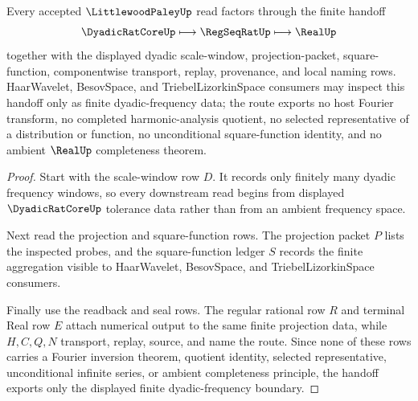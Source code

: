 \begin{theorem}
\label{thm:littlewood-paley-dyadic-frequency-handoff}
Every accepted $\LittlewoodPaleyUp$ read factors through the finite handoff
$$
\DyadicRatCoreUp \longmapsto \RegSeqRatUp \longmapsto \RealUp
$$
together with the displayed dyadic scale-window, projection-packet, square-function, componentwise transport, replay, provenance, and local naming rows. HaarWavelet, BesovSpace, and TriebelLizorkinSpace consumers may inspect this handoff only as finite dyadic-frequency data; the route exports no host Fourier transform, no completed harmonic-analysis quotient, no selected representative of a distribution or function, no unconditional square-function identity, and no ambient $\RealUp$ completeness theorem.
\end{theorem}
\begin{proof}
Start with the scale-window row $D$. It records only finitely many dyadic frequency windows, so every downstream read begins from displayed $\DyadicRatCoreUp$ tolerance data rather than from an ambient frequency space.

Next read the projection and square-function rows. The projection packet $P$ lists the inspected probes, and the square-function ledger $S$ records the finite aggregation visible to HaarWavelet, BesovSpace, and TriebelLizorkinSpace consumers.

Finally use the readback and seal rows. The regular rational row $R$ and terminal Real row $E$ attach numerical output to the same finite projection data, while $H,C,Q,N$ transport, replay, source, and name the route. Since none of these rows carries a Fourier inversion theorem, quotient identity, selected representative, unconditional infinite series, or ambient completeness principle, the handoff exports only the displayed finite dyadic-frequency boundary.
\end{proof}



